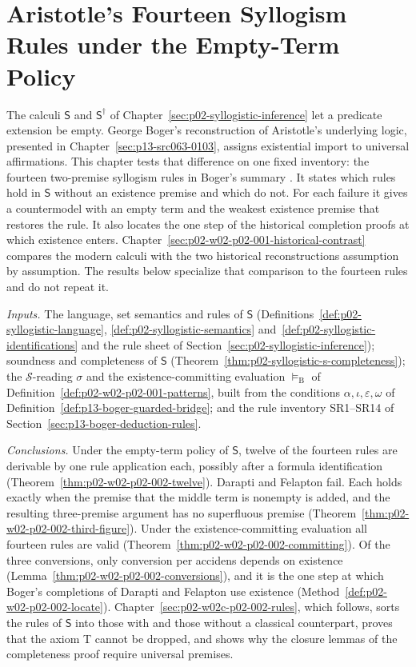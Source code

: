 \chapter{Aristotle's Fourteen Syllogism Rules under the Empty-Term Policy}
\label{sec:p02-w02-p02-002-fourteen}

The calculi \(\mathsf S\) and \(\mathsf S^\dagger\) of
Chapter~\ref{sec:p02-syllogistic-inference} let a predicate extension be
empty. George Boger's reconstruction of Aristotle's underlying logic, presented in
Chapter~\ref{sec:p13-src063-0103}, assigns existential import to universal
affirmations. This chapter tests that difference on one fixed inventory: the
fourteen two-premise syllogism rules in Boger's summary
\cite[p.~188, table~20]{Boger2004UnderlyingLogic}. It states which rules hold
in \(\mathsf S\) without an existence premise and which do not. For each
failure it gives a countermodel with an empty term and the weakest existence
premise that restores the rule. It also locates the one step of the
historical completion proofs at which existence enters.
Chapter~\ref{sec:p02-w02-p02-001-historical-contrast} compares the modern
calculi with the two historical reconstructions assumption by assumption.
The results below specialize that comparison to the fourteen rules and do not
repeat it.

\emph{Inputs.} The language, set semantics and rules of \(\mathsf S\)
(Definitions~\ref{def:p02-syllogistic-language},
\ref{def:p02-syllogistic-semantics}
and~\ref{def:p02-syllogistic-identifications}
and the rule sheet of Section~\ref{sec:p02-syllogistic-inference}); soundness and completeness of \(\mathsf S\)
(Theorem~\ref{thm:p02-syllogistic-s-completeness}); the \(\mathcal S\)-reading
\(\sigma\) and the existence-committing evaluation \(\models_{\mathrm B}\) of
Definition~\ref{def:p02-w02-p02-001-patterns}, built from the conditions
\(\alpha,\iota,\varepsilon,\omega\) of
Definition~\ref{def:p13-boger-guarded-bridge}; and the rule inventory
SR1--SR14 of Section~\ref{sec:p13-boger-deduction-rules}.

\emph{Conclusions.} Under the empty-term policy of \(\mathsf S\), twelve of
the fourteen rules are derivable by one rule application each, possibly
after a formula identification (Theorem~\ref{thm:p02-w02-p02-002-twelve}).
Darapti and Felapton fail. Each holds exactly when the premise that the
middle term is nonempty is added, and the resulting three-premise argument
has no superfluous premise (Theorem~\ref{thm:p02-w02-p02-002-third-figure}).
Under the existence-committing evaluation all fourteen rules are valid
(Theorem~\ref{thm:p02-w02-p02-002-committing}). Of the three conversions,
only conversion per accidens depends on existence
(Lemma~\ref{thm:p02-w02-p02-002-conversions}), and it is the one step at
which Boger's completions of Darapti and Felapton use existence
(Method~\ref{def:p02-w02-p02-002-locate}).
Chapter~\ref{sec:p02-w02c-p02-002-rules}, which follows, sorts the rules of
\(\mathsf S\) into those with and those without a classical counterpart,
proves that the axiom T cannot be dropped, and shows why the closure lemmas
of the completeness proof require universal premises.


